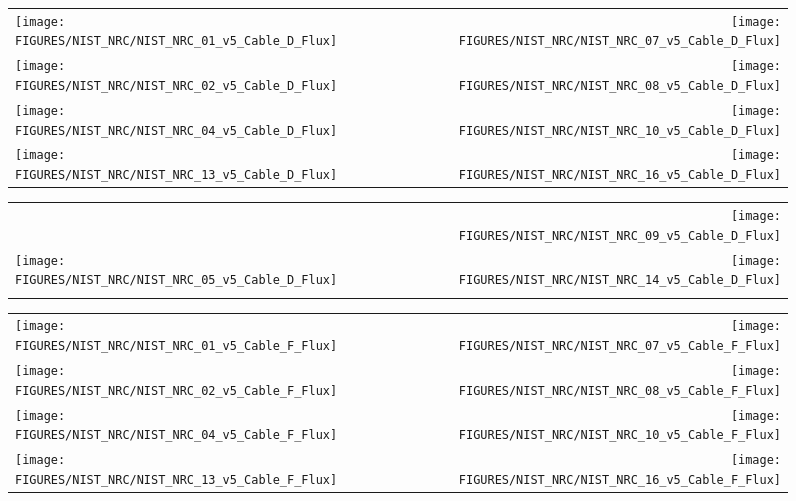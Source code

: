 \begin{figure}[p]
\begin{tabular*}{\textwidth}{l@{\extracolsep{\fill}}r}
\texttt{[image: FIGURES/NIST\_NRC/NIST\_NRC\_01\_v5\_Cable\_D\_Flux]} &
\texttt{[image: FIGURES/NIST\_NRC/NIST\_NRC\_07\_v5\_Cable\_D\_Flux]} \\
\texttt{[image: FIGURES/NIST\_NRC/NIST\_NRC\_02\_v5\_Cable\_D\_Flux]} &
\texttt{[image: FIGURES/NIST\_NRC/NIST\_NRC\_08\_v5\_Cable\_D\_Flux]} \\
\texttt{[image: FIGURES/NIST\_NRC/NIST\_NRC\_04\_v5\_Cable\_D\_Flux]} &
\texttt{[image: FIGURES/NIST\_NRC/NIST\_NRC\_10\_v5\_Cable\_D\_Flux]} \\
\texttt{[image: FIGURES/NIST\_NRC/NIST\_NRC\_13\_v5\_Cable\_D\_Flux]} &
\texttt{[image: FIGURES/NIST\_NRC/NIST\_NRC\_16\_v5\_Cable\_D\_Flux]}
\end{tabular*}
\label{NIST_NRC_Cable_D_Flux_Closed}
\end{figure}

\begin{figure}[p]
\begin{tabular*}{\textwidth}{l@{\extracolsep{\fill}}r}
                           &
\texttt{[image: FIGURES/NIST\_NRC/NIST\_NRC\_09\_v5\_Cable\_D\_Flux]} \\
\texttt{[image: FIGURES/NIST\_NRC/NIST\_NRC\_05\_v5\_Cable\_D\_Flux]} &
\texttt{[image: FIGURES/NIST\_NRC/NIST\_NRC\_14\_v5\_Cable\_D\_Flux]} \\
                      &
\end{tabular*}
\label{NIST_NRC_Cable_D_Flux_Open}
\end{figure}

\begin{figure}[p]
\begin{tabular*}{\textwidth}{l@{\extracolsep{\fill}}r}
\texttt{[image: FIGURES/NIST\_NRC/NIST\_NRC\_01\_v5\_Cable\_F\_Flux]} &
\texttt{[image: FIGURES/NIST\_NRC/NIST\_NRC\_07\_v5\_Cable\_F\_Flux]} \\
\texttt{[image: FIGURES/NIST\_NRC/NIST\_NRC\_02\_v5\_Cable\_F\_Flux]} &
\texttt{[image: FIGURES/NIST\_NRC/NIST\_NRC\_08\_v5\_Cable\_F\_Flux]} \\
\texttt{[image: FIGURES/NIST\_NRC/NIST\_NRC\_04\_v5\_Cable\_F\_Flux]} &
\texttt{[image: FIGURES/NIST\_NRC/NIST\_NRC\_10\_v5\_Cable\_F\_Flux]} \\
\texttt{[image: FIGURES/NIST\_NRC/NIST\_NRC\_13\_v5\_Cable\_F\_Flux]} &
\texttt{[image: FIGURES/NIST\_NRC/NIST\_NRC\_16\_v5\_Cable\_F\_Flux]}
\end{tabular*}
\label{NIST_NRC_Cable_F_Flux_Closed}
\end{figure}

